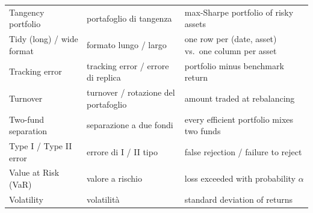 \documentclass[11pt,a4paper]{report}
\begin{document}
{\begin{longtable}{@{}p{4.2cm}p{4.2cm}p{6.6cm}@{}}
Tangency portfolio & portafoglio di tangenza & max-Sharpe portfolio of risky assets \\
Tidy (long) / wide format & formato lungo / largo & one row per (date, asset) vs.\ one column per asset \\
Tracking error & tracking error / errore di replica & portfolio minus benchmark return \\
Turnover & turnover / rotazione del portafoglio & amount traded at rebalancing \\
Two-fund separation & separazione a due fondi & every efficient portfolio mixes two funds \\
Type I / Type II error & errore di I / II tipo & false rejection / failure to reject \\
Value at Risk (VaR) & valore a rischio & loss exceeded with probability $\alpha$ \\
Volatility & volatilità & standard deviation of returns \\
\bottomrule
\end{longtable}
}

\end{document}
